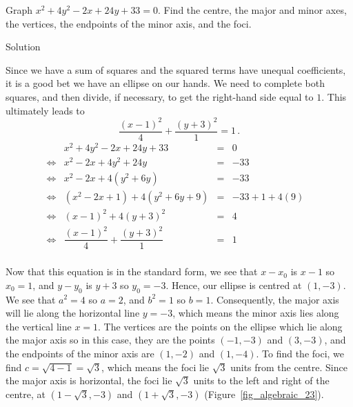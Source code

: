 \begin{example} \label{ctsellipseex} 

Graph $x^2+4y^2-2x+24y+33 = 0$. Find the centre, the major and minor axes, the vertices, the endpoints of the minor axis, and the foci.


Solution 


 Since we have a sum of squares and the squared terms have unequal coefficients, it is a good bet we have an ellipse on our hands.  We need to complete both squares, and then divide, if necessary, to get the right-hand side equal to $1$.
 \ifanalysis
 This ultimately leads to
 $$
 \dfrac{(x-1)^2}{4} + \dfrac{(y+3)^2}{1}  =  1\,.
 $$
\fi
\ifcalculus
\[ \begin{array}{rrclr} 
&x^2+4y^2-2x+24y+33 & = & 0 & \\
\Leftrightarrow&x^2-2x+4y^2+24y & = & -33 & \\
\Leftrightarrow&x^2 - 2x + 4\left(y^2+6y\right)  &  = & - 33 &  \\
\Leftrightarrow&\left(x^2 - 2x +1\right) + 4\left(y^2+6y+9\right)  &  = & - 33 + 1 + 4(9)& \\
\Leftrightarrow&(x-1)^2 + 4(y+3)^2  &  = & 4 & \\[5pt]  
\Leftrightarrow&\dfrac{(x-1)^2}{4} + \dfrac{(y+3)^2}{1} & = & 1& \\  \end{array} \]

\medskip
\fi

Now that this equation is in the standard form, we see that $x-x_0$ is $x-1$ so $x_0 = 1$, and $y-y_0$ is $y+3$ so $y_0 = -3$.  Hence, our ellipse is centred at $(1,-3)$.  We see that $a^2 = 4$ so $a=2$, and $b^2 = 1$ so $b=1$.  Consequently, the major axis will lie along the horizontal line $y=-3$, which means the minor axis lies along the vertical line $x = 1$. The vertices are the points on the ellipse which lie along the major axis so in this case, they are the points $(-1,-3)$ and $(3,-3)$, and the endpoints of the minor axis are $(1,-2)$ and $(1,-4)$. To find the foci, we find $c = \sqrt{4-1} = \sqrt{3}$, which means the foci lie $\sqrt{3}$ units from the centre. Since the major axis is horizontal, the foci lie $\sqrt{3}$ units to the left and right of the centre, at $(1-\sqrt{3},-3)$ and $(1+\sqrt{3},-3)$ (Figure~\ref{fig_algebraic_23}).  


\end{example}
